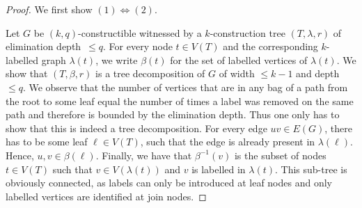 \documentclass[10pt,a4paper]{article}
\newcommand{\elimOrd}[2]{$(#1,#2)$-constructible}
\newcommand{\elimDepth}{elimination depth}
\begin{document}
\ekqEquiv*

\begin{proof}
	We first show $(1)\Leftrightarrow (2)$.
	
	Let $G$ be \elimOrd{k}{q} witnessed by a $k$-construction tree $(T,\lambda,r)$ of \elimDepth\ $\leq q$.
	For every node $t\in V(T)$ and the corresponding $k$-labelled graph $\lambda(t)$, we write $\beta(t)$ for the set of labelled vertices of $\lambda(t)$.
	We show that $(T,\beta,r)$ is a tree decomposition of $G$ of width $\leq k-1$ and depth $\leq q$.
	We observe that the number of vertices that are in any bag of a path from the root to some leaf equal the number of times a label was removed on the same path and therefore is bounded by the \elimDepth.
	Thus one only has to show that this is indeed a tree decomposition.
	For every edge $uv\in E(G)$, there has to be some leaf $\ell\in V(T)$, such that the edge is already present in $\lambda(\ell)$. Hence, $u,v \in \beta(\ell)$.
	Finally, we have that $\beta^{-1}(v)$ is the subset of nodes $t\in V(T)$ such that $v\in V(\lambda(t))$ and $v$ is labelled in $\lambda(t)$.
	This sub-tree is obviously connected, as labels can only be introduced at leaf nodes and only labelled vertices are identified at join nodes.
	

\end{proof}
\end{document}
